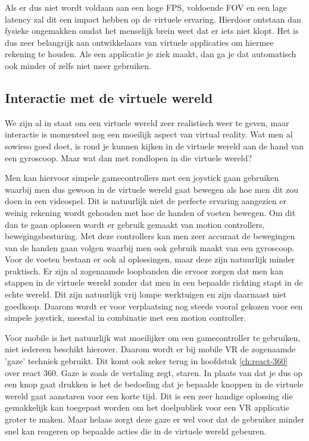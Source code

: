 Als er dus niet wordt voldaan aan een hoge FPS, voldoende FOV en een lage latency zal dit  een impact hebben op de virtuele ervaring. Hierdoor ontstaan dan fysieke ongemakken omdat het menselijk brein weet dat er iets niet klopt. Het is dus zeer belangrijk aan ontwikkelaars van virtuele applicaties om hiermee rekening te houden. Als een applicatie je ziek maakt, dan ga je dat automatisch ook minder of zelfs niet meer gebruiken.

\subsection{Interactie met de virtuele wereld}
\label{subsec:interactie-vr}
We  zijn al in staat om een virtuele wereld zeer realistisch weer te geven, maar interactie is momenteel nog een moeilijk aspect van virtual reality. Wat men al sowieso goed doet, is rond je kunnen kijken in de virtuele wereld aan de hand van een gyroscoop. Maar wat dan met rondlopen in die virtuele wereld?

Men kan hiervoor simpele gamecontrollers met een joystick gaan gebruiken waarbij men dus gewoon in de virtuele wereld gaat bewegen als hoe men dit zou doen in een videospel. Dit is natuurlijk niet de perfecte ervaring aangezien er weinig rekening wordt gehouden met hoe de handen of voeten bewegen. Om dit dan te gaan oplossen wordt er gebruik gemaakt van motion controllers, bewegingsbesturing. Met deze controllers kan men zeer accuraat de bewegingen van de handen gaan volgen waarbij men ook gebruik maakt van een gyroscoop. Voor de voeten bestaan er ook al oplossingen, maar deze zijn natuurlijk minder praktisch. Er zijn al zogenaamde loopbanden die ervoor zorgen dat men kan stappen in de virtuele wereld zonder dat men in een bepaalde richting stapt in de echte wereld. Dit zijn natuurlijk vrij lompe werktuigen en zijn daarnaast niet goedkoop. Daarom wordt er voor verplaatsing nog steeds vooral gekozen voor een simpele joystick, meestal in combinatie met een motion controller.

Voor mobile is het natuurlijk wat moeilijker om een gamecontroller te gebruiken, niet iedereen beschikt hierover. Daarom wordt er bij mobile VR de zogenaamde 'gaze' techniek gebruikt. Dit komt ook zeker terug in hoofdstuk \ref{ch:react-360} over react 360. Gaze is zoals de vertaling zegt, staren. In plaats van dat je dus op een knop gaat drukken is het de bedoeling dat je bepaalde knoppen in de virtuele wereld gaat aanstaren voor een korte tijd. Dit is een zeer handige oplossing die gemakkelijk kan toegepast worden om het doelpubliek voor een VR applicatie groter te maken. Maar helaas zorgt deze gaze er wel voor dat de gebruiker minder snel kan reageren op bepaalde acties die in de virtuele wereld gebeuren.

